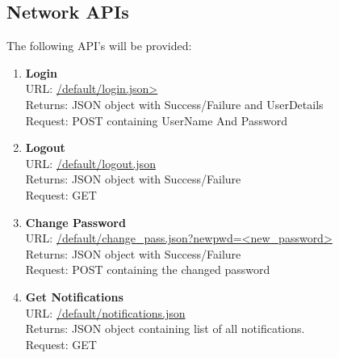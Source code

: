 \documentclass{article}
\begin{document}
			\subsection{Network APIs}
				The following API's will be provided:  ~\cite{Basic_Code}
				\begin{enumerate}
					\item \textbf{Login} \\
						URL: \url{/default/login.json>}  \\
						Returns: JSON object with Success/Failure and UserDetails	\\
						Request: POST containing UserName And Password
					\item \textbf{Logout} \\
						URL: \url{/default/logout.json} \\
						Returns: JSON object with Success/Failure\\
						Request: GET
					\item \textbf{Change Password} \\
						URL: \url{/default/change_pass.json?newpwd=<new_password>} \\
						Returns: JSON object with Success/Failure \\
						Request: POST containing the changed password	
					\item \textbf{Get Notifications} \\
						URL: \url{/default/notifications.json} \\
						Returns: JSON object containing list of all notifications.\\
						Request: GET 
						

\end{enumerate}
\end{document}
